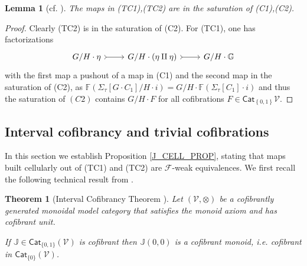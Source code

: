\documentclass[a4paper,10pt
 ,final
]{article}%
\numberwithin{equation}{section}
\numberwithin{figure}{section}
\newtheorem{theorem}[equation]{Theorem}%
\newtheorem{lemma}[equation]{Lemma}%
\theoremstyle{definition} %
\newtheorem{remark}[equation]{Remark}%
\newcommand{\set}[1]{\left\{#1\right\}}%
\newcommand{\Cat}{\mathsf{Cat}}
\newcommand{\F}{\ensuremath{\mathcal F}}
\newcommand{\V}{\ensuremath{\mathcal V}}
\newcommand{\1}{\ensuremath{\mathbbm 1}}%
\begin{document}




\begin{lemma}[{cf. \cite[1.19]{CM13b}}]\label{POINT_4_LEMMA}
	The maps in (TC1),(TC2) are in the saturation of (C1),(C2).
\end{lemma}

\begin{proof}
        Clearly (TC2) is in the saturation of (C2).
	For (TC1), one has factorizations
\begin{equation}
	\begin{tikzcd}
	G/H \cdot \eta \arrow[r, rightarrowtail]
&
	G/H \cdot (\eta \amalg \eta) \arrow[r, rightarrowtail]
&
	G/H \cdot \mathbb{G}
	\end{tikzcd}
\end{equation}
with the first map a pushout of a map in (C1) and 
the second map in the saturation of (C2),
as
$\mathbb F(\Sigma_\tau[G \cdot C_1]/H \cdot i) = G/H \cdot \mathbb F(\Sigma_\tau[C_1] \cdot i)$
and thus the saturation of $(C2)$ contains $G/H \cdot F$ for all cofibrations $F \in \Cat_{\set{0,1}}\V$.
\end{proof}





\subsection{Interval cofibrancy and trivial cofibrations}
\label{TRIVCOF_SEC}


In this section we establish Proposition \ref{J_CELL_PROP},
stating that maps built cellularly out of
(TC1) and (TC2) are $\F$-weak equivalences.
We first recall the following
technical result from \cite{BM13}.


\begin{theorem}
[Interval Cofibrancy Theorem {\cite[Thm. 1.15]{BM13}}]
\label{INTCOF THM}
Let $(\V,\otimes)$ be a cofibrantly generated monoidal model category that
satisfies the monoid axiom and has cofibrant unit.

If $\mathbb{J} \in \mathsf{Cat}_{\{0,1\}}(\V)$
is cofibrant then 
$\mathbb{J}(0,0)$ 
is a cofibrant monoid, i.e. cofibrant
in $ \mathsf{Cat}_{\{0\}}(\V)$.
\end{theorem}
\end{document}
